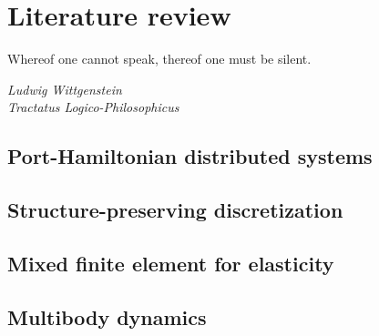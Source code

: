 \chapter[Literature review]{Literature review}

\epigraph{Whereof one cannot speak, thereof one must be silent.}{\textit{ Ludwig Wittgenstein \\ Tractatus Logico-Philosophicus}}

\section{Port-Hamiltonian distributed systems}

\section{Structure-preserving discretization}

\section{Mixed finite element for elasticity}

\section{Multibody dynamics}